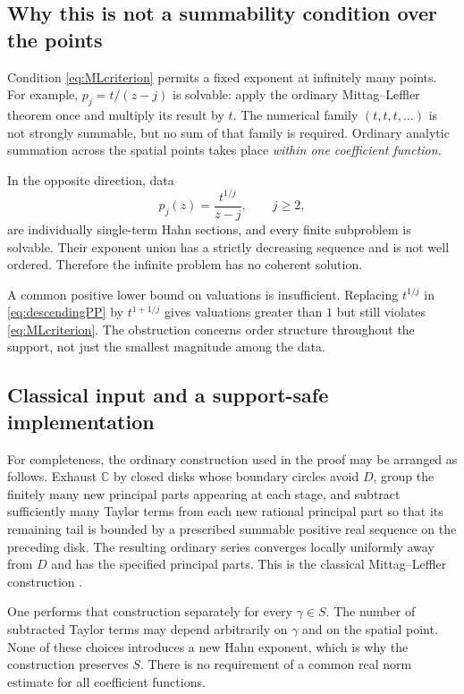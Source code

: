 \documentclass[11pt,letterpaper]{article}
\theoremstyle{definition}
\theoremstyle{remark}
\newcommand{\C}{\mathbb C}
\numberwithin{equation}{section}
\begin{document}
\subsection{Why this is not a summability condition over the points}
Condition \eqref{eq:MLcriterion} permits a fixed exponent at infinitely many points. For example, $p_j=t/(z-j)$ is solvable: apply the ordinary Mittag--Leffler theorem once and multiply its result by $t$. The numerical family $(t,t,t,\ldots)$ is not strongly summable, but no sum of that family is required. Ordinary analytic summation across the spatial points takes place \emph{within one coefficient function}.

In the opposite direction, data
\begin{equation}\label{eq:descendingPP}
 p_j(z)=\frac{t^{1/j}}{z-j},\qquad j\ge2,
\end{equation}
are individually single-term Hahn sections, and every finite subproblem is solvable. Their exponent union has a strictly decreasing sequence and is not well ordered. Therefore the infinite problem has no coherent solution.

A common positive lower bound on valuations is insufficient. Replacing $t^{1/j}$ in \eqref{eq:descendingPP} by $t^{1+1/j}$ gives valuations greater than $1$ but still violates \eqref{eq:MLcriterion}. The obstruction concerns order structure throughout the support, not just the smallest magnitude among the data.

\subsection{Classical input and a support-safe implementation}
For completeness, the ordinary construction used in the proof may be arranged as follows. Exhaust $\C$ by closed disks whose boundary circles avoid $D$, group the finitely many new principal parts appearing at each stage, and subtract sufficiently many Taylor terms from each new rational principal part so that its remaining tail is bounded by a prescribed summable positive real sequence on the preceding disk. The resulting ordinary series converges locally uniformly away from $D$ and has the specified principal parts. This is the classical Mittag--Leffler construction \cite{Ahlfors}.

One performs that construction separately for every $\gamma\in S$. The number of subtracted Taylor terms may depend arbitrarily on $\gamma$ and on the spatial point. None of these choices introduces a new Hahn exponent, which is why the construction preserves $S$. There is no requirement of a common real norm estimate for all coefficient functions.
\end{document}
